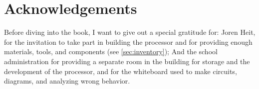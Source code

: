 \section{Acknowledgements}

Before diving into the book, I want to give out a special gratitude for:
	Joren Heit, for the invitation to take part in building the processor and for providing enough materials, tools, and components (see \ref{sec:inventory});
	And the school administration for providing a separate room in the building for storage and the development of the processor, and for the whiteboard used to make circuits, diagrams, and analyzing wrong behavior.